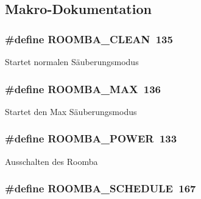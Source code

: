 \subsection{Makro-\/\-Dokumentation}
\hypertarget{group__roomba__commands__clean_gad7000006fd0c76b02fe0104236929bc9}{
\subsubsection[{R\-O\-O\-M\-B\-A\-\_\-\-C\-L\-E\-A\-N}]{\setlength{\rightskip}{0pt plus 5cm}\#define R\-O\-O\-M\-B\-A\-\_\-\-C\-L\-E\-A\-N~135}}\label{group__roomba__commands__clean_gad7000006fd0c76b02fe0104236929bc9}
Startet normalen Säuberungsmodus \hypertarget{group__roomba__commands__clean_ga1b7bd60b7ae1d7268b5b9f6313d97968}{
\subsubsection[{R\-O\-O\-M\-B\-A\-\_\-\-M\-A\-X}]{\setlength{\rightskip}{0pt plus 5cm}\#define R\-O\-O\-M\-B\-A\-\_\-\-M\-A\-X~136}}\label{group__roomba__commands__clean_ga1b7bd60b7ae1d7268b5b9f6313d97968}
Startet den Max Säuberungsmodus \hypertarget{group__roomba__commands__clean_gaf03948b7555c48fca7d01a6bbfb1cc67}{
\subsubsection[{R\-O\-O\-M\-B\-A\-\_\-\-P\-O\-W\-E\-R}]{\setlength{\rightskip}{0pt plus 5cm}\#define R\-O\-O\-M\-B\-A\-\_\-\-P\-O\-W\-E\-R~133}}\label{group__roomba__commands__clean_gaf03948b7555c48fca7d01a6bbfb1cc67}
Ausschalten des Roomba \hypertarget{group__roomba__commands__clean_gadb4e4068df85b8ae807bd81bba4cd48e}{
\subsubsection[{R\-O\-O\-M\-B\-A\-\_\-\-S\-C\-H\-E\-D\-U\-L\-E}]{\setlength{\rightskip}{0pt plus 5cm}\#define R\-O\-O\-M\-B\-A\-\_\-\-S\-C\-H\-E\-D\-U\-L\-E~167}}\label{group__roomba__commands__clean_gadb4e4068df85b8ae807bd81bba4cd48e}
